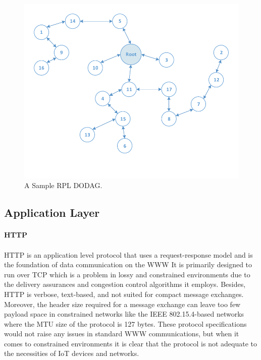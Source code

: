 \begin{figure}[h!]
  \centering
  \includegraphics[width=0.9\linewidth]{figures/RPL_DODAG.pdf}
  \caption{A Sample RPL DODAG.}
  \label{fig:rpl_dodag}
\end{figure}

\subsection{Application Layer}

\paragraph{\textbf{\gls{HTTP}}}
\paragraph{}
	\gls{HTTP} is an application level protocol that uses a request-response model and is the foundation of data communication on the \gls{WWW} It is primarily designed to run over \gls{TCP} which is a problem in lossy and constrained environments due to the delivery assurances and congestion control algorithms it employs. Besides, {HTTP} is verbose, text-based, and not suited for compact message exchanges. Moreover, the header size required for a message exchange can leave too few payload space in constrained networks like the IEEE 802.15.4-based networks where the \gls{MTU} size of the protocol is 127 bytes. These protocol specifications would not raise any issues in standard \gls{WWW} communications, but when it comes to constrained environments it is clear that the protocol is not adequate to the necessities of \gls{IoT} devices and networks.

